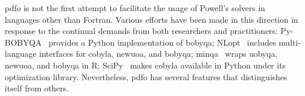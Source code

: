 \Gls{pdfo} is not the first attempt to facilitate the usage of Powell's solvers in languages other than Fortran.
Various efforts have been made in this direction in response to the continual demands from both researchers and practitioners: Py-BOBYQA~\cite{Cartis_Etal_2019} provides a Python implementation of \gls{bobyqa}; NLopt~\cite{Johnson_2019} includes multi-language interfaces for \gls{cobyla}, \gls{newuoa}, and \gls{bobyqa}; minqa~\cite{Bates_Etal_2014} wraps \gls{uobyqa}, \gls{newuoa}, and \gls{bobyqa} in R; SciPy~\cite{Virtanen_Etal_2020} makes \gls{cobyla} available in Python under its optimization library. Nevertheless, \gls{pdfo} has several features that distinguishes itself from others.




